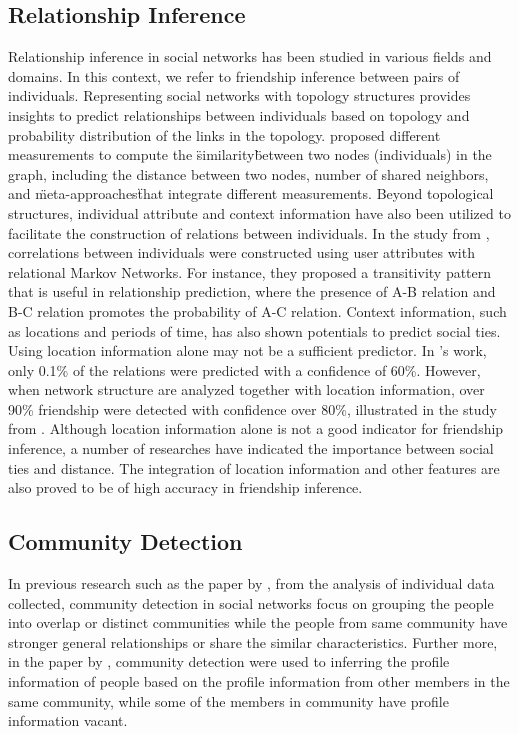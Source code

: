 \documentclass[11pt]{article}
\begin{document}
\subsection{Relationship Inference}
Relationship inference in social networks has been studied in various fields and domains. In this context, we refer to friendship inference between pairs of individuals. Representing social networks with topology structures provides insights to predict relationships  between individuals based on topology and probability distribution of the links in the topology. \cite{liben-nowell_link-prediction_2007} proposed different measurements to compute the \"similarity\" between two nodes (individuals) in the graph, including the distance between two nodes, number of shared neighbors, and \"meta-approaches\" that integrate different measurements. Beyond topological structures, individual attribute and context information have also been utilized to facilitate the construction of relations between individuals. In the study from \cite{taskar_link_2004}, correlations between individuals were constructed using user attributes with relational Markov Networks. For instance, they proposed a transitivity pattern that is useful in relationship prediction, where the presence of A-B relation and B-C relation promotes the probability of A-C relation. Context information, such as locations and periods of time, has also shown potentials to predict social ties. Using location information alone may not be a sufficient predictor. In \cite{crandall_inferring_2010}'s work, only 0.1\% of the relations were predicted with a confidence of 60\%. However, when network structure are analyzed together with location information, over 90\% friendship were detected with confidence over 80\%, illustrated in the study from \cite{sadilek_finding_2012}. Although location information alone is not a good indicator for friendship inference, a number of researches have indicated the importance between social ties and distance. The integration of location information and other features are also proved to be of high accuracy in friendship inference.

\subsection{Community Detection}
In previous research such as the paper by \cite{xie_community_2011}, from the analysis of individual data collected, community detection in social networks focus on grouping the people into overlap or distinct communities while the people from same community have stronger general relationships or share the similar characteristics. Further more, in the paper by \cite{mislove_you_2010}, community detection were used to inferring the profile information of people based on the profile information from other members in the same community, while some of the members in community have profile information vacant.
\end{document}
